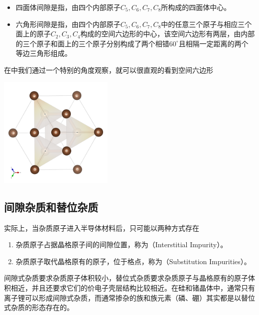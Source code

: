 \begin{itemize}
    \item 四面体间隙是指，由四个内部原子$C_5,C_6,C_7,C_8$所构成的四面体中心。
    \item 六角形间隙是指，由四个内部原子$C_5,C_6,C_7,C_8$中的任意三个原子与相应三个面上的原子$C_2,C_3,C_4$构成的空间六边形的中心，该空间六边形有两层，由内部的三个原子和面上的三个原子分别构成了两个相错$60^{\circ}$且相隔一定距离的两个等边三角形组成。
\end{itemize}
在中我们通过一个特别的角度观察，就可以很直观的看到空间六边形
\begin{Figure}[金刚石结构中的空间六角形]
    \includegraphics[width=5.5cm]{VESTA/output/Diamond_HEX.png}
\end{Figure}

\subsection{间隙杂质和替位杂质}

实际上，当杂质原子进入半导体材料后，只可能以两种方式存在
\begin{enumerate}
    \item 杂质原子占据晶格原子间的间隙位置，称为（Interstitial Impurity）。
    \item 杂质原子取代晶格原有的原子，位于格点，称为（Substitution Impurities）。
\end{enumerate}
间隙式杂质要求杂质原子体积较小，替位式杂质要求杂质原子与晶格原有的原子体积相近，并且还要求它们的价电子壳层结构比较相近。在硅和锗晶体中，通常只有离子锂可以形成间隙式杂质，而通常掺杂的族和族元素（磷、硼）其实都是以替位式杂质的形态存在的。

